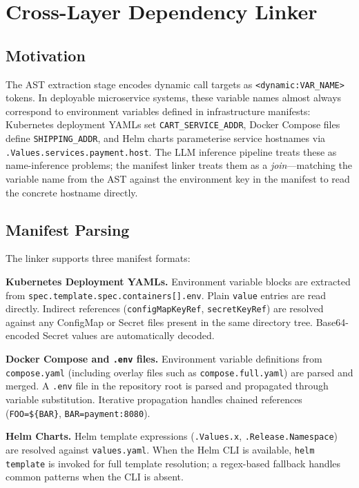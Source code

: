 \documentclass[runningheads]{llncs}
\begin{document}
\section{Cross-Layer Dependency Linker}
\label{sec:linker}

\subsection{Motivation}

The AST extraction stage encodes dynamic call targets as
\texttt{<dynamic:VAR\_NAME>} tokens. In deployable microservice systems,
these variable names almost always correspond to environment variables defined
in infrastructure manifests: Kubernetes deployment YAMLs set
\texttt{CART\_SERVICE\_ADDR}, Docker Compose files define
\texttt{SHIPPING\_ADDR}, and Helm charts parameterise service hostnames via
\texttt{.Values.services.payment.host}. The LLM inference pipeline treats
these as name-inference problems; the manifest linker treats them as a
\emph{join}---matching the variable name from the AST against the environment
key in the manifest to read the concrete hostname directly.

\subsection{Manifest Parsing}

The linker supports three manifest formats:

\textbf{Kubernetes Deployment YAMLs.} Environment variable blocks are
extracted from \texttt{spec.template.spec.containers[].env}. Plain
\texttt{value} entries are read directly. Indirect references
(\texttt{configMapKeyRef}, \texttt{secretKeyRef}) are resolved against any
ConfigMap or Secret files present in the same directory tree.
Base64-encoded Secret values are automatically decoded.

\textbf{Docker Compose and \texttt{.env} files.} Environment variable
definitions from \texttt{compose.yaml} (including overlay files such as
\texttt{compose.full.yaml}) are parsed and merged. A \texttt{.env} file in
the repository root is parsed and propagated through variable substitution.
Iterative propagation handles chained references
(\texttt{FOO=\$\{BAR\}}, \texttt{BAR=payment:8080}).

\textbf{Helm Charts.} Helm template expressions (\texttt{.Values.x},
\texttt{.Release.Namespace}) are resolved against \texttt{values.yaml}.
When the Helm CLI is available, \texttt{helm template} is invoked for full
template resolution; a regex-based fallback handles common patterns when the
CLI is absent.
\end{document}
